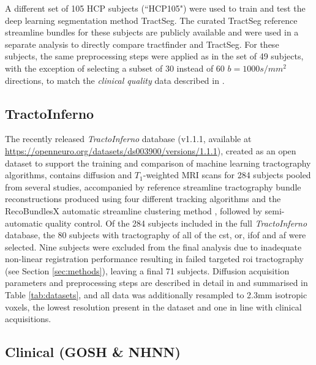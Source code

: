 A different set of 105 HCP subjects (``HCP105") were used to train and test the deep learning segmentation method TractSeg\autocite{Wasserthal2018}.
The curated TractSeg reference streamline bundles for these subjects are publicly available\autocite{Wasserthal2018b} and were used in a separate analysis to directly compare tractfinder and TractSeg.
For these subjects, the same preprocessing steps were applied as in the set of 49 subjects, with the exception of selecting a subset of 30 instead of 60 $b=1000s/mm^2$ directions, to match the \textit{clinical quality} data described in \textcite{Wasserthal2018}.

\subsection{TractoInferno}

The recently released \textit{TractoInferno} database (v1.1.1, available at \url{https://openneuro.org/datasets/ds003900/versions/1.1.1})\autocite{Poulin2022a,Poulin2022}, created as an open dataset to support the training and comparison of machine learning tractography algorithms, contains diffusion and $T_1$-weighted MRI scans for 284 subjects pooled from several studies, accompanied by reference streamline tractography bundle reconstructions produced using four different tracking algorithms and the RecoBundlesX automatic streamline clustering method \autocite{Garyfallidis2018,Rheault2020a}, followed by semi-automatic quality control.
Of the 284 subjects included in the full \textit{TractoInferno} database, the 80 subjects with tractography of all of the \gls{cst}, \gls{or}, \gls{ifof} and \gls{af} were selected.
Nine subjects were excluded from the final analysis due to inadequate non-linear registration performance resulting in failed targeted \gls{roi} tractography (see Section \ref{sec:methods}), leaving a final 71 subjects.
Diffusion acquisition parameters and preprocessing steps are described in detail in \textcite{Poulin2022} and summarised in Table \ref{tab:datasets}, and all data was additionally resampled to 2.3mm isotropic voxels, the lowest resolution present in the dataset and one in line with clinical acquisitions.

\subsection{Clinical (GOSH \& NHNN)}

